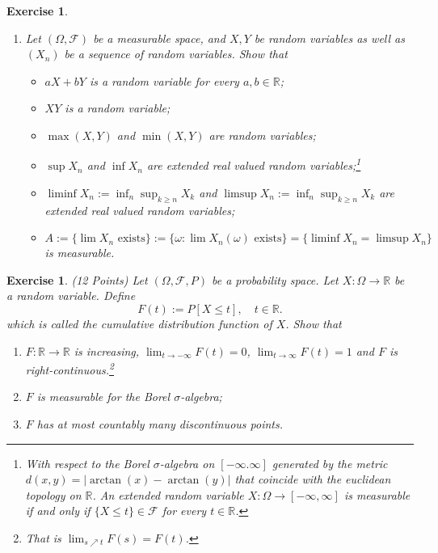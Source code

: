 \documentclass[DIV=classic,a4paper,10pt]{scrartcl}
\newtheorem{exercise}[theorem]{Exercise}
\theoremstyle{nonumberplain}
\numberwithin{equation}{section}
\begin{document}
\begin{exercise}
\begin{enumerate}[label=(\alph*), fullwidth]
        \item Let $(\Omega, \mathcal{F})$ be a measurable space, and $X,Y$ be random variables as well as $(X_n)$ be a sequence of random variables.
            Show that
            \begin{itemize}
                \item $aX+bY$ is a random variable for every $a,b \in \mathbb{R}$;
                \item $XY$ is a random variable;
                \item $\max(X,Y)$ and $\min(X,Y)$ are random variables;
                \item $\sup X_n$ and $\inf X_n$ are extended real valued random variables;\footnote{With respect to the Borel $\sigma$-algebra on $[-\infty.\infty]$ generated by the metric $d(x,y)=|\arctan(x)-\arctan(y)|$ that coincide with the euclidean topology on $\mathbb{R}$. An extended random variable $X:\Omega \to [-\infty,\infty]$ is measurable if and only if $\{X\leq t\} \in \mathcal{F}$ for every $t \in \mathbb{R}$.}
                \item $\liminf X_n:=\inf_n\sup_{k\geq n}X_k$ and $\limsup X_n:=\inf_n\sup_{k\geq n}X_k$ are extended real valued random variables;
                \item $A:=\{\lim X_n \text{ exists}\}:=\{\omega \colon \lim X_n(\omega)\text{ exists}\}=\{\liminf X_n=\limsup X_n\}$ is measurable.
            \end{itemize}
    \end{enumerate}
\end{exercise}


\begin{exercise} (12 Points) \newline
    Let $(\Omega,\mathcal{F},P)$ be a probability space.
    Let $X:\Omega \to \mathbb{R}$ be a random variable.
    Define
    \begin{equation*}
        F(t):=P[X\leq t], \quad t \in \mathbb{R}.
    \end{equation*}
    which is called the \emph{cumulative distribution function of }$X$.
    Show that
    \begin{enumerate}[label=\arabic*)]
        \item $F:\mathbb{R}\to \mathbb{R}$ is increasing, $\lim_{t \to -\infty}F(t)=0$, $\lim_{t \to \infty}F(t)=1$ and $F$ is right-continuous.\footnote{That is $\lim_{s\nearrow t}F(s)=F(t)$.}
        \item $F$ is measurable for the Borel $\sigma$-algebra;
        \item $F$ has at most countably many discontinuous points.
    \end{enumerate}
\end{exercise}
\end{document}
